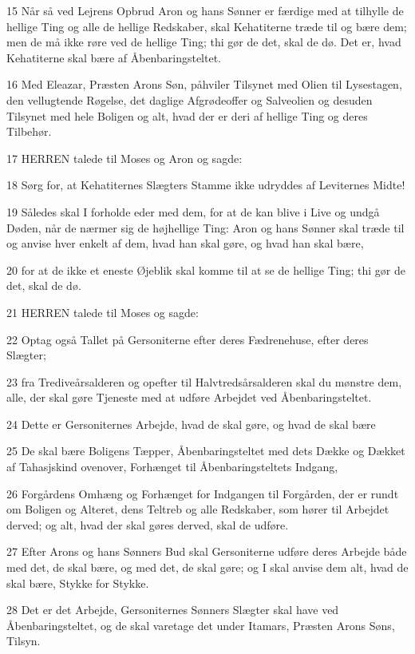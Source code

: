 \par 15 Når så ved Lejrens Opbrud Aron og hans Sønner er færdige med at tilhylle de hellige Ting og alle de hellige Redskaber, skal Kehatiterne træde til og bære dem; men de må ikke røre ved de hellige Ting; thi gør de det, skal de dø. Det er, hvad Kehatiterne skal bære af Åbenbaringsteltet.
\par 16 Med Eleazar, Præsten Arons Søn, påhviler Tilsynet med Olien til Lysestagen, den vellugtende Røgelse, det daglige Afgrødeoffer og Salveolien og desuden Tilsynet med hele Boligen og alt, hvad der er deri af hellige Ting og deres Tilbehør.
\par 17 HERREN talede til Moses og Aron og sagde:
\par 18 Sørg for, at Kehatiternes Slægters Stamme ikke udryddes af Leviternes Midte!
\par 19 Således skal I forholde eder med dem, for at de kan blive i Live og undgå Døden, når de nærmer sig de højhellige Ting: Aron og hans Sønner skal træde til og anvise hver enkelt af dem, hvad han skal gøre, og hvad han skal bære,
\par 20 for at de ikke et eneste Øjeblik skal komme til at se de hellige Ting; thi gør de det, skal de dø.
\par 21 HERREN talede til Moses og sagde:
\par 22 Optag også Tallet på Gersoniterne efter deres Fædrenehuse, efter deres Slægter;
\par 23 fra Trediveårsalderen og opefter til Halvtredsårsalderen skal du mønstre dem, alle, der skal gøre Tjeneste med at udføre Arbejdet ved Åbenbaringsteltet.
\par 24 Dette er Gersoniternes Arbejde, hvad de skal gøre, og hvad de skal bære
\par 25 De skal bære Boligens Tæpper, Åbenbaringsteltet med dets Dække og Dækket af Tahasjskind ovenover, Forhænget til Åbenbaringsteltets Indgang,
\par 26 Forgårdens Omhæng og Forhænget for Indgangen til Forgården, der er rundt om Boligen og Alteret, dens Teltreb og alle Redskaber, som hører til Arbejdet derved; og alt, hvad der skal gøres derved, skal de udføre.
\par 27 Efter Arons og hans Sønners Bud skal Gersoniterne udføre deres Arbejde både med det, de skal bære, og med det, de skal gøre; og I skal anvise dem alt, hvad de skal bære, Stykke for Stykke.
\par 28 Det er det Arbejde, Gersoniternes Sønners Slægter skal have ved Åbenbaringsteltet, og de skal varetage det under Itamars, Præsten Arons Søns, Tilsyn.
